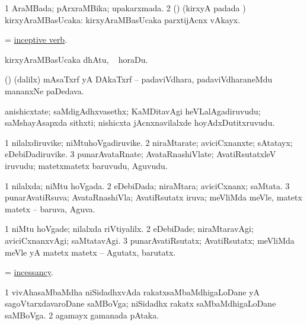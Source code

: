 \bentry
{}
\gl{\gu}
\bmng
\bnum
\num{1} AraMBada; pArxraMBika; upakarxmada. 
\hypertarget{inceptive gu(2)}{} 
\num{2} (\vAyx) (kirxyA padada \vi) kirxyAraMBasUcaka:  kirxyAraMBasUcaka parxtijAcnx vAkayx. 
\enum
\emng
\eentry

\bentry
{}
\gl{\nA}
\bmng
 = \hyperlink{inceptive verb}{inceptive verb}. 
\emng
\eentry

\bentry
{}
\gl{\nA}
\bmng
kirxyAraMBasUcaka dhAtu, \udA\  horaDu. 
\emng
\eentry

\bentry
{}
\gl{\nA}
\bmng
(\ca) (\vivi dalilx) mAsaTxrf yA DAkaTxrf -- padaviVdhara, padaviVdharaneMdu mananxNe paDedava. 
\emng
\eentry

\bentry
{}
\gl{\nA}
\bmng
anishicxtate; saMdigAdhxvasethx; KaMDitavAgi heVLalAgadiruvudu; saMshayAsapxda sithxti; nishicxta jAcnxnavilalxde hoyAdxDutitxruvudu. 
\emng
\eentry

\bentry
{}
\gl{\nA}
\bmng
\bnum
\num{1} nilalxdiruvike; niMtuhoVgadiruvike. 
\num{2} niraMtarate; aviciCxnanxte; sAtatayx; eDebiDadiruvike. 
\num{3} punarAvataRnate; AvataRnashiVlate; AvatiRsutatxleV iruvudu; matetxmatetx baruvudu, Aguvudu. 
\enum
\emng
\eentry

\bentry
{}
\gl{\gu}
\bmng
\bnum
\num{1} nilalxda; niMtu hoVgada. 
\num{2} eDebiDada; niraMtara; aviciCxnanx; saMtata. 
\num{3} punarAvatiRsuva; AvataRnashiVla; AvatiRsutatx iruva; meVliMda meVle, matetx matetx -- baruva, Aguva. 
\enum
\emng
\eentry

\bentry
{}
\gl{\kirxvi}
\bmng
\bnum
\num{1} niMtu hoVgade; nilalxda riVtiyalilx. 
\num{2} eDebiDade; niraMtaravAgi; aviciCxnanxvAgi; saMtatavAgi. 
\num{3} punarAvatiRsutatx; AvatiRsutatx; meVliMda meVle yA matetx matetx -- Agutatx, barutatx. 
\enum
\emng
\eentry

\bentry
{}
\gl{\nA}
\bmng
 = \hyperlink{incessancy}{incessancy}. 
\emng
\eentry

\bentry
{}
\gl{\nA}
\bmng
\bnum
\num{1} vivAhasaMbaMdha niSidadhxvAda rakatxsaMbaMdhigaLoDane yA sagoVtarxdavaroDane saMBoVga; niSidadhx rakatx saMbaMdhigaLoDane saMBoVga. 
\num{2} agamayx gamanada pAtaka. 
\enum
\emng
\eentry

